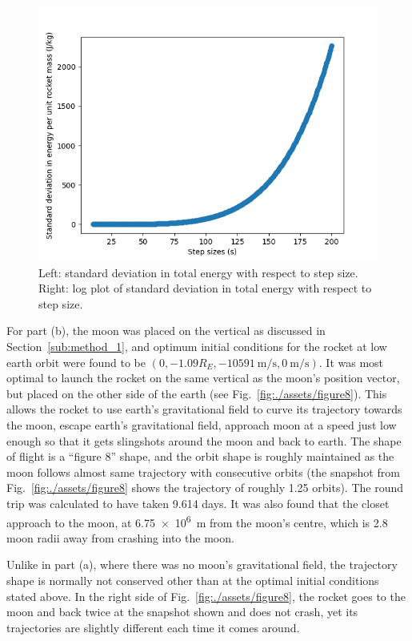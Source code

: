 \documentclass[hyphens,twocolumn,nobalancelastpage,aps,10pt,citeautoscript,longbibliography]{revtex4-2}
\begin{document}
\begin{figure}[htpb]
	\centering
	\includegraphics[width=\linewidth]{./assets/step_size_std_energy.png}
	\caption{Left: standard deviation in total energy with respect to step
	size. Right: log plot of standard deviation in total energy with respect to
	step size.}%
	\label{fig:./assets/step_size_std_energy}
\end{figure}

For part (b), the moon was placed on the vertical as discussed in
Section~\ref{sub:method_1}, and optimum initial conditions for the rocket at
low earth orbit were found to be $(0, -1.09 R_E,
\qty{-10591}{\metre\per\second}, \qty{0}{\metre\per\second})$. It was most
optimal to launch the rocket on the same vertical as the moon's position
vector, but placed on the other side of the earth (see
Fig.~\ref{fig:./assets/figure8}). This allows the rocket to use earth's
gravitational field to curve its trajectory towards the moon, escape earth's
gravitational field, approach moon at a speed just low enough so that it gets
slingshots around the moon and back to earth. The shape of flight is a ``figure
8'' shape, and the orbit shape is roughly maintained as the moon follows almost
same trajectory with consecutive orbits (the snapshot from
Fig.~\ref{fig:./assets/figure8} shows the trajectory of roughly 1.25 orbits).
The round trip was calculated to have taken 9.614 days. It was also found that
the closet approach to the moon, at \qty{6.75e6}{m} from the moon's centre,
which is 2.8 moon radii away from crashing into the moon.

Unlike in part (a), where there was no moon's gravitational field, the
trajectory shape is normally not conserved other than at the optimal initial
conditions stated above. In the right side of Fig.~\ref{fig:./assets/figure8},
the rocket goes to the moon and back twice at the snapshot shown and does not
crash, yet its trajectories are slightly different each time it comes around.
\end{document}
